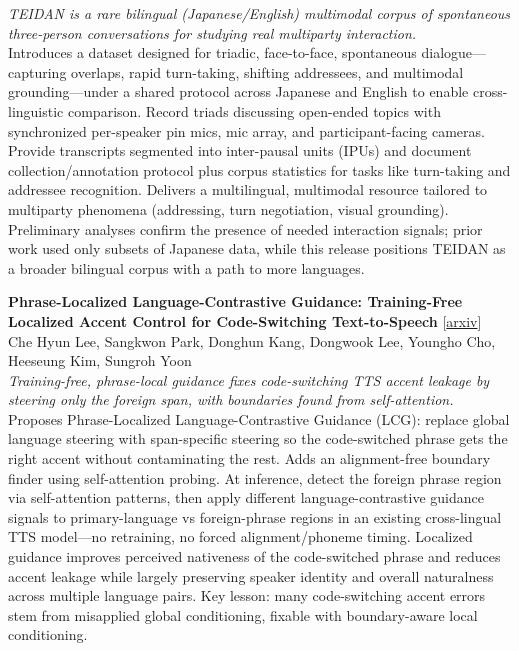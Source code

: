 \documentclass[12pt,letterpaper]{article}
\begin{document}
{\small\textit{TEIDAN is a rare bilingual (Japanese/English) multimodal corpus of spontaneous three-person conversations for studying real multiparty interaction.}}\\[1pt]
{\footnotesize Introduces a dataset designed for triadic, face-to-face, spontaneous dialogue---capturing overlaps, rapid turn-taking, shifting addressees, and multimodal grounding---under a shared protocol across Japanese and English to enable cross-linguistic comparison. Record triads discussing open-ended topics with synchronized per-speaker pin mics, mic array, and participant-facing cameras. Provide transcripts segmented into inter-pausal units (IPUs) and document collection/annotation protocol plus corpus statistics for tasks like turn-taking and addressee recognition. Delivers a multilingual, multimodal resource tailored to multiparty phenomena (addressing, turn negotiation, visual grounding). Preliminary analyses confirm the presence of needed interaction signals; prior work used only subsets of Japanese data, while this release positions TEIDAN as a broader bilingual corpus with a path to more languages.}

\medskip

{\small\textbf{Phrase-Localized Language-Contrastive Guidance: Training-Free Localized Accent Control for Code-Switching Text-to-Speech}} {\scriptsize[\href{https://arxiv.org/abs/2609.01016}{arxiv}]}\\
{\scriptsize Che Hyun Lee, Sangkwon Park, Donghun Kang, Dongwook Lee, Youngho Cho, Heeseung Kim, Sungroh Yoon}\\

{\small\textit{Training-free, phrase-local guidance fixes code-switching TTS accent leakage by steering only the foreign span, with boundaries found from self-attention.}}\\[1pt]
{\footnotesize Proposes Phrase-Localized Language-Contrastive Guidance (LCG): replace global language steering with span-specific steering so the code-switched phrase gets the right accent without contaminating the rest. Adds an alignment-free boundary finder using self-attention probing. At inference, detect the foreign phrase region via self-attention patterns, then apply different language-contrastive guidance signals to primary-language vs foreign-phrase regions in an existing cross-lingual TTS model---no retraining, no forced alignment/phoneme timing. Localized guidance improves perceived nativeness of the code-switched phrase and reduces accent leakage while largely preserving speaker identity and overall naturalness across multiple language pairs. Key lesson: many code-switching accent errors stem from misapplied global conditioning, fixable with boundary-aware local conditioning.}
\end{document}
